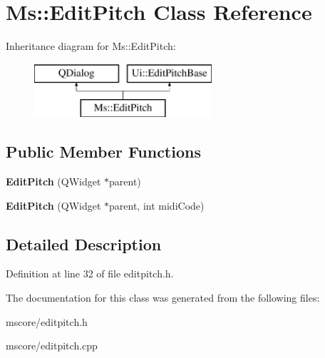 \hypertarget{class_ms_1_1_edit_pitch}{}\section{Ms\+:\+:Edit\+Pitch Class Reference}
\label{class_ms_1_1_edit_pitch}
Inheritance diagram for Ms\+:\+:Edit\+Pitch\+:\begin{figure}[H]
\begin{center}
\leavevmode
\includegraphics[height=2.000000cm]{class_ms_1_1_edit_pitch}
\end{center}
\end{figure}
\subsection*{Public Member Functions}
\begin{DoxyCompactItemize}
\item 
\mbox{\label{class_ms_1_1_edit_pitch_ab14fa979b80f733f8163a92161b04eeb}} 
{\bfseries Edit\+Pitch} (Q\+Widget $\ast$parent)
\item 
\mbox{\label{class_ms_1_1_edit_pitch_ae922dd595f2e9c2eb2d572d66027d08e}} 
{\bfseries Edit\+Pitch} (Q\+Widget $\ast$parent, int midi\+Code)
\end{DoxyCompactItemize}


\subsection{Detailed Description}


Definition at line 32 of file editpitch.\+h.



The documentation for this class was generated from the following files\+:\begin{DoxyCompactItemize}
\item 
mscore/editpitch.\+h\item 
mscore/editpitch.\+cpp\end{DoxyCompactItemize}
